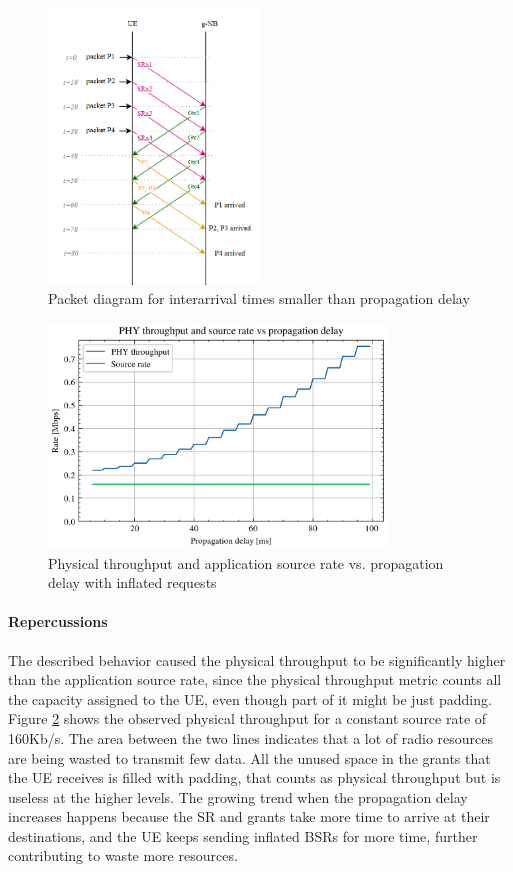 \begin{figure}[ht]
    \centering
    \includegraphics[width=0.5\textwidth]{res/diagram-inflated-bsr.png}
    \caption{Packet diagram for interarrival times smaller than propagation delay}
    \label{fig:inflated-bsr-diag}
\end{figure}
\begin{figure}[ht!]
    \centering
    \includegraphics[width=0.8\textwidth]{res/phy-thr-udp-runaway-new.png}
    \caption{Physical throughput and application source rate vs. propagation delay with inflated requests}
    \label{fig:phy-thr-runaway}
\end{figure}
\paragraph{Repercussions}
The described behavior caused the physical throughput to be significantly higher than the application source rate, since the physical throughput metric counts all the capacity assigned to the \ac{UE}, even though part of it might be just padding. Figure \ref{fig:phy-thr-runaway} shows the observed physical throughput for a constant source rate of 160Kb/s. The area between the two lines indicates that a lot of radio resources are being wasted to transmit few data. All the unused space in the grants that the \ac{UE} receives is filled with padding, that counts as physical throughput but is useless at the higher levels. The growing trend when the propagation delay increases happens because the \ac{SR} and grants take more time to arrive at their destinations, and the \ac{UE} keeps sending inflated \ac{BSR}s for more time, further contributing to waste more resources.



